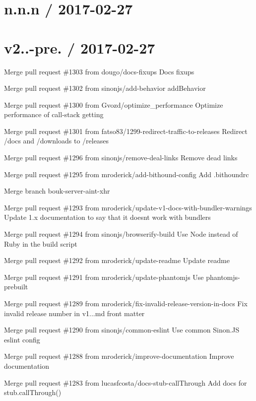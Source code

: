 \section*{n.\+n.\+n / 2017-\/02-\/27 }

\section*{v2..-\/pre. / 2017-\/02-\/27 }


\begin{DoxyItemize}
\item Merge pull request \#1303 from dougo/docs-\/fixups Docs fixups
\item Merge pull request \#1302 from sinonjs/add-\/behavior add\+Behavior
\item Merge pull request \#1300 from Gvozd/optimize\+\_\+performance Optimize performance of call-\/stack getting
\item Merge pull request \#1301 from fatso83/1299-\/redirect-\/traffic-\/to-\/releases Redirect /docs and /downloads to /releases
\item Merge pull request \#1296 from sinonjs/remove-\/deal-\/links Remove dead links
\item Merge pull request \#1295 from mroderick/add-\/bithound-\/config Add .bithoundrc
\item Merge branch \textquotesingle{}bouk-\/server-\/aint-\/xhr\textquotesingle{}
\item Merge pull request \#1293 from mroderick/update-\/v1-\/docs-\/with-\/bundler-\/warnings Update 1.\+x documentation to say that it doesn\textquotesingle{}t work with bundlers
\item Merge pull request \#1294 from sinonjs/browserify-\/build Use Node instead of Ruby in the build script
\item Merge pull request \#1292 from mroderick/update-\/readme Update readme
\item Merge pull request \#1291 from mroderick/update-\/phantomjs Use phantomjs-\/prebuilt
\item Merge pull request \#1289 from mroderick/fix-\/invalid-\/release-\/version-\/in-\/docs Fix invalid release number in v1...\+md front matter
\item Merge pull request \#1290 from sinonjs/common-\/eslint Use common Sinon.\+JS eslint config
\item Merge pull request \#1288 from mroderick/improve-\/documentation Improve documentation
\item Merge pull request \#1283 from lucasfcosta/docs-\/stub-\/call\+Through Add docs for stub.\+call\+Through()

\end{DoxyItemize}
